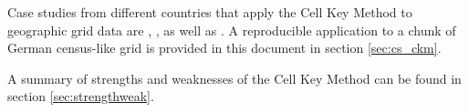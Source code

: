 

Case studies from different countries that apply the Cell Key Method to geographic grid data are \citet{Kraus2021}, \citet{Dekany2019}, as well as \citet{LukanSmukavec2017}. A reproducible application to a chunk of German census-like grid is provided in this document in section \ref{sec:cs_ckm}.

A summary of strengths and weaknesses of the Cell Key Method can be found in section \ref{sec:strengthweak}.

\newpage
